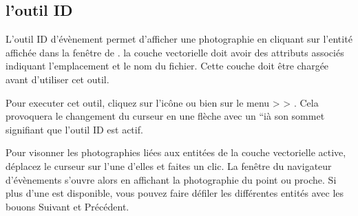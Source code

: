\subsection{l'outil ID}\label{evis_id_tool}

L'outil ID d'évènement permet d'afficher une photographie en cliquant sur l'entité affichée dans la fenêtre de \qg. la couche vectorielle doit avoir des attributs associés indiquant l'emplacement et le nom du fichier. Cette couche doit être chargée avant d'utiliser cet outil.

\label{evis_launch_id}


Pour executer cet outil, cliquez sur l'icône  ou bien sur le menu  >  > . Cela provoquera le changement du curseur en une flèche avec un ``i\fg   à son sommet signifiant que l'outil ID est actif.


Pour visonner les photographies liées aux entitées de la couche vectorielle active, déplacez le curseur sur l'une d'elles et faites un clic. La fenêtre du navigateur d'évènements s'ouvre alors en affichant la photographie du point ou proche. Si plus d'une est disponible, vous pouvez faire défiler les différentes entités avec les bouons Suivant et Précédent.

